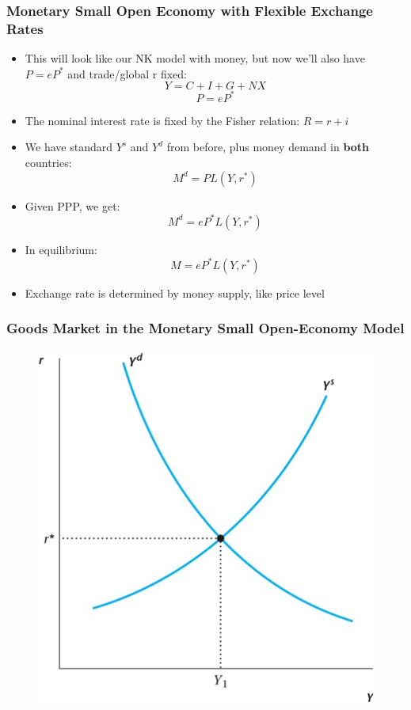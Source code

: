 \documentclass{beamer}
\begin{document}
\begin{frame}
\frametitle[alignment=center]{Monetary Small Open Economy with Flexible Exchange Rates}
\begin{itemize}
\item This will look like our NK model with money, but now we'll also have $P=eP^*$ and trade/global r fixed:
$$Y=C+I+G+NX$$
$$P=eP^*$$
\item The nominal interest rate is fixed by the Fisher relation: $R=r+i$
\item We have standard $Y^s$ and $Y^d$ from before, plus money demand in \textbf{both} countries:
$$M^d=PL(Y,r^*)$$
\item Given PPP, we get:
$$M^d=eP^*L(Y,r^*)$$
\item In equilibrium:
$$M=eP^*L(Y,r^*)$$
\item Exchange rate is determined by money supply, like price level
\end{itemize}
\end{frame}

\begin{frame}
\frametitle[alignment=center]{Goods Market in the Monetary Small Open-Economy Model}
\begin{figure}
\centering
\includegraphics[scale=0.73]{Figures/W_Fig_17pt2.png}
\end{figure}
\end{frame}
\end{document}
